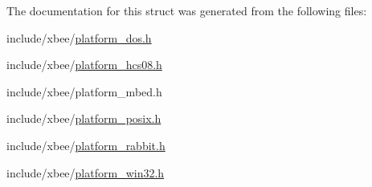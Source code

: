 The documentation for this struct was generated from the following files\+:\begin{DoxyCompactItemize}
\item 
include/xbee/\hyperlink{platform__dos_8h}{platform\+\_\+dos.\+h}\item 
include/xbee/\hyperlink{platform__hcs08_8h}{platform\+\_\+hcs08.\+h}\item 
include/xbee/platform\+\_\+mbed.\+h\item 
include/xbee/\hyperlink{platform__posix_8h}{platform\+\_\+posix.\+h}\item 
include/xbee/\hyperlink{platform__rabbit_8h}{platform\+\_\+rabbit.\+h}\item 
include/xbee/\hyperlink{platform__win32_8h}{platform\+\_\+win32.\+h}\end{DoxyCompactItemize}
